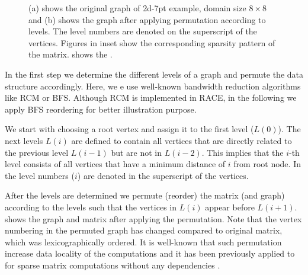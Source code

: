 \begin{figure}[tb]
{\begin{picture}
		\end{picture}
	}
	\caption{\label{fig:level_construction}(a) shows the original graph of 2d-7pt example, domain size $8 \times 8$  and (b) shows the graph after applying permutation according to levels. The level numbers are denoted on the superscript of the vertices. Figures in inset show the corresponding sparsity pattern of the matrix.  shows the \levelPtr.}
\end{figure}
In the first step we determine the different levels of a graph and permute the data structure accordingly.
Here, we e use well-known bandwidth reduction algorithms like \Acrfull{RCM}\cite{RCM}
 or \Acrfull{BFS}\cite{BFS}. Although \acrshort{RCM} is implemented in \acrshort{RACE},
 in the following we apply \acrshort{BFS} reordering for better illustration purpose. 
 
We start with choosing a root vertex and assign it to the first level ($L(0)$). 
The next levels $L(i)$ are defined to contain all vertices that are directly related to the previous
level $L(i-1)$ but are not in $L(i-2)$. This implies that the $i$-th level consists of all vertices
that have a minimum distance of $i$ from root node. In  the
level numbers ($i$) are denoted in the superscript of the vertices. 

After the levels are determined we permute (reorder) the matrix (and graph) according
to the levels such that the vertices in $L(i)$ appear before $L(i+1)$.  
shows the graph and matrix after applying the permutation. Note that the vertex numbering 
in the permuted graph has changed compared to original matrix, which was lexicographically ordered.
It is well-known  that such permutation increase data locality
of the computations and it has been previously applied to for sparse matrix
computations without any dependencies \cite{RCM_Sparse_computation}.

